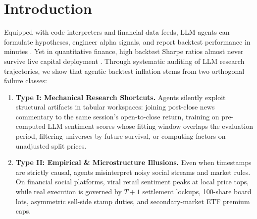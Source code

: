 \section{Introduction}
\label{sec:intro}

Equipped with code interpreters and financial data feeds, LLM agents can formulate hypotheses, engineer alpha signals, and report backtest performance in minutes \citep{wu2023bloomberggpt,yang2023fingpt,yu2024finmem,zhang2024finagent}. Yet in quantitative finance, high backtest Sharpe ratios almost never survive live capital deployment \citep{bailey2014deflated,bailey2017pbo,lopezdeprado2018advances}. Through systematic auditing of LLM research trajectories, we show that agentic backtest inflation stems from two orthogonal failure classes:
\begin{enumerate}
    \item \textbf{Type I: Mechanical Research Shortcuts.} Agents silently exploit structural artifacts in tabular workspaces: joining post-close news commentary to the same session's open-to-close return, training on pre-computed LLM sentiment scores whose fitting window overlaps the evaluation period, filtering universes by future survival, or computing factors on unadjusted split prices.
    \item \textbf{Type II: Empirical \& Microstructure Illusions.} Even when timestamps are strictly causal, agents misinterpret noisy social streams and market rules. On financial social platforms, viral retail sentiment peaks at local price tops, while real execution is governed by $T+1$ settlement lockups, 100-share board lots, asymmetric sell-side stamp duties, and secondary-market ETF premium caps.
\end{enumerate}

